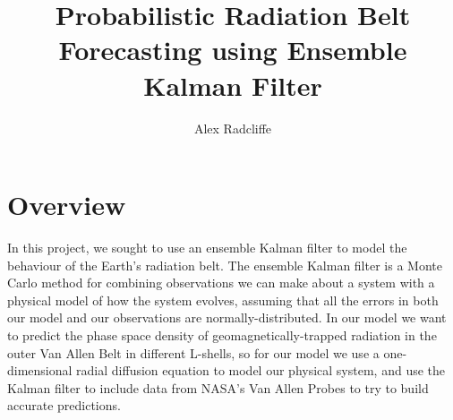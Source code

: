 \documentclass[a4paper, fleqn]{article}
\begin{document}
\title{Probabilistic Radiation Belt Forecasting using Ensemble Kalman Filter}
\author{Alex Radcliffe}
\maketitle
\pagestyle{myheadings}
\section{Overview}
In this project, we sought to use an ensemble Kalman filter to model the behaviour of the Earth's radiation belt. The ensemble Kalman filter is a Monte Carlo method for combining observations we can make about a system with a physical model of how the system evolves, assuming that all the errors in both our model and our observations are normally-distributed. In our model we want to predict the phase space density of geomagnetically-trapped radiation in the outer Van Allen Belt in different L-shells, so for our model we use a one-dimensional radial diffusion equation to model our physical system, and use the Kalman filter to include data from NASA's Van Allen Probes to try to build accurate predictions.
\end{document}
